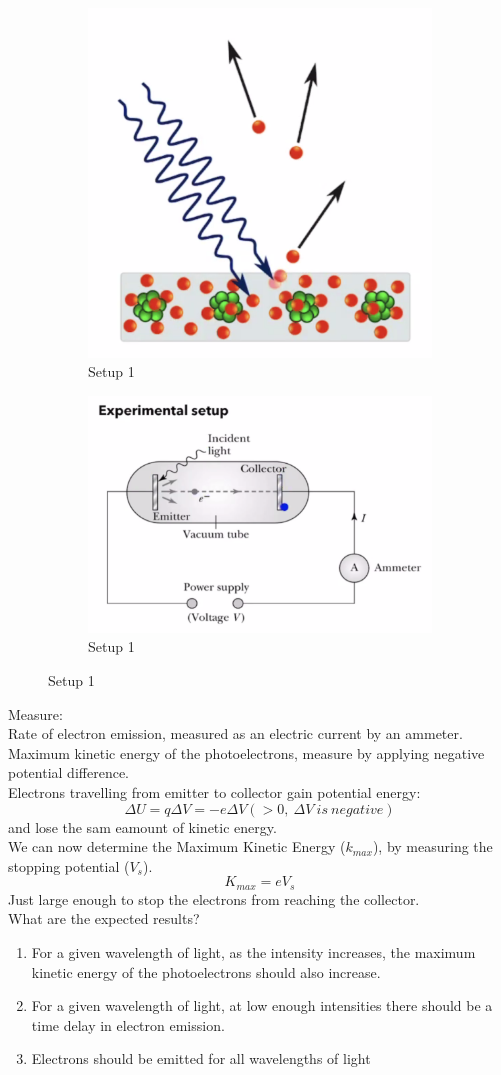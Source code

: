 \documentclass[class=article,crop=false]{standalone}
\begin{document}
\begin{figure}[h!]
	\centering
	\begin{subfigure}[b]{0.4\linewidth}
		\includegraphics[width=.3\linewidth]{./Images/work_function.png}
		\caption{Setup 1}
	\end{subfigure}
	\begin{subfigure}[b]{0.4\linewidth}
		\includegraphics[width=.4\linewidth]{./Images/work_function_setup.png}
		\caption{Setup 1}
	\end{subfigure}
\end{figure}

Measure:\\
Rate of electron emission, measured as an electric current by an ammeter.\\
Maximum kinetic energy of the photoelectrons, measure by applying negative potential difference. \\
Electrons travelling from emitter to collector gain potential energy:\\
$$ \Delta U = q \Delta V = -e \Delta V (> 0,\ \Delta V\ is\ negative)$$
and lose the sam eamount of kinetic energy.\\

We can now determine the Maximum Kinetic Energy ($k_{max}$), by measuring the stopping potential ($V_s$).\\
$$ K_{max} = e V_s $$
Just large enough to stop the electrons from reaching the collector. \\

What are the expected results?
\begin{enumerate}
	\item For a given wavelength of light, as the intensity increases, the maximum kinetic energy of the photoelectrons should also increase.
	\item For a given wavelength of light, at low enough intensities there should be a time delay in electron emission.
	\item Electrons should be emitted for all wavelengths of light
\end{enumerate}
\end{document}
